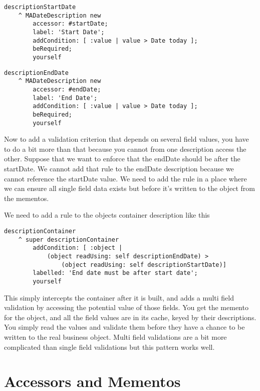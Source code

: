 \documentclass[a4paper,10pt,twoside]{book}
\begin{document}
\begin{lstlisting}
descriptionStartDate
    ^ MADateDescription new 
        accessor: #startDate;
        label: 'Start Date';
        addCondition: [ :value | value > Date today ];
        beRequired;
        yourself

\end{lstlisting}

\begin{lstlisting}
descriptionEndDate
    ^ MADateDescription new 
        accessor: #endDate;
        label: 'End Date';
        addCondition: [ :value | value > Date today ];
        beRequired;
        yourself
\end{lstlisting}

Now to add a validation criterion that depends on several field values, you have to do a bit more than that because you cannot from one description access the other. Suppose that we want to enforce that the endDate should be after the startDate. We cannot add that rule to the  endDate description because we cannot reference the startDate value. We need to add the rule in a place  where we can ensure all single field data exists but before it's written to the object from the mementos. 

We need to add a rule to the objects container description like this

\begin{lstlisting}
descriptionContainer 
    ^ super descriptionContainer
        addCondition: [ :object |
            (object readUsing: self descriptionEndDate) > 
                (object readUsing: self descriptionStartDate)]
        labelled: 'End date must be after start date';
        yourself
\end{lstlisting}

This simply intercepts the container after it is built, and adds a multi field validation by accessing the potential value of those fields. You get the memento for the object, and all the field values are in its cache, keyed by their descriptions. You simply read the values and validate them before they have a chance to be written to the real business object. Multi field validations are a bit more complicated than single field validations but this pattern works well.

\section{Accessors and Mementos}
\label{book:advanced:magritte:accessorsmementos}
\end{document}
